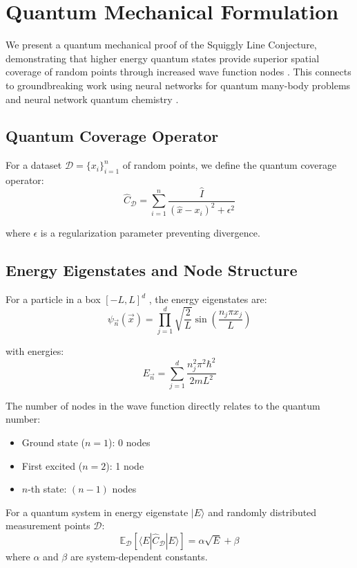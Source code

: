 \section{Quantum Mechanical Formulation}
\label{sec:quantum_theory}

We present a quantum mechanical proof of the Squiggly Line Conjecture, demonstrating that higher energy quantum states provide superior spatial coverage of random points through increased wave function nodes \cite{Dirac1982PrinciplesOQ}. This connects to groundbreaking work using neural networks for quantum many-body problems \cite{Carleo2017NeuralQuantum, InfiniteNeuralQuantum2023} and neural network quantum chemistry \cite{NeuralQuantumChemistry}.

\subsection{Quantum Coverage Operator}

For a dataset $\mathcal{D} = \{x_i\}_{i=1}^n$ of random points, we define the quantum coverage operator:
$$\hat{C}_\mathcal{D} = \sum_{i=1}^n \frac{\hat{I}}{(\hat{x} - x_i)^2 + \epsilon^2}$$

where $\epsilon$ is a regularization parameter preventing divergence.

\subsection{Energy Eigenstates and Node Structure}

For a particle in a box $[-L, L]^d$ \cite{Sakurai1986ModernQM}, the energy eigenstates are:
$$\psi_{\vec{n}}(\vec{x}) = \prod_{j=1}^d \sqrt{\frac{2}{L}} \sin\left(\frac{n_j \pi x_j}{L}\right)$$

with energies:
$$E_{\vec{n}} = \sum_{j=1}^d \frac{n_j^2 \pi^2 \hbar^2}{2mL^2}$$

The number of nodes in the wave function directly relates to the quantum number:
\begin{itemize}
    \item Ground state ($n=1$): 0 nodes
    \item First excited ($n=2$): 1 node  
    \item $n$-th state: $(n-1)$ nodes
\end{itemize}

\begin{theorem}
For a quantum system in energy eigenstate $|E\rangle$ and randomly distributed measurement points $\mathcal{D}$:
$$\mathbb{E}_\mathcal{D}[\langle E | \hat{C}_\mathcal{D} | E \rangle] = \alpha \sqrt{E} + \beta$$
where $\alpha$ and $\beta$ are system-dependent constants.
\end{theorem}

